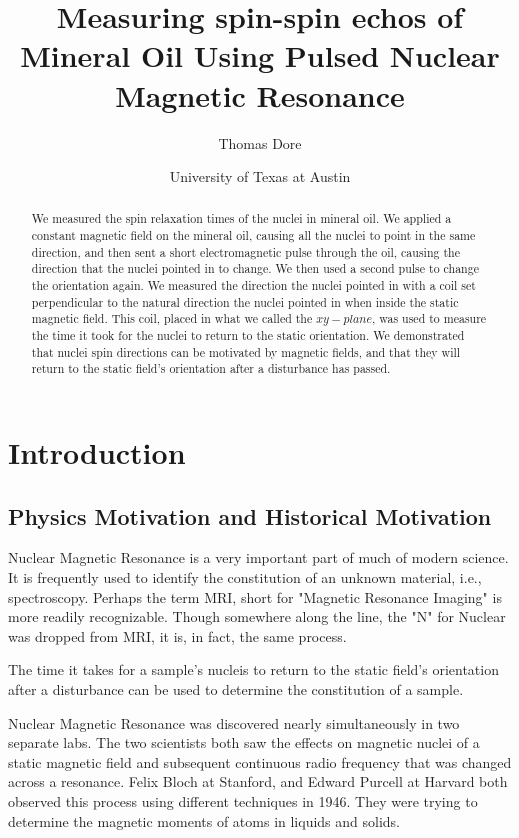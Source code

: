 \documentclass{article}
\title{Measuring spin-spin echos of Mineral Oil Using Pulsed Nuclear Magnetic Resonance}
\author{Thomas Dore}
\date{University of Texas at Austin}
\begin{document}
\maketitle

\begin{abstract}
We measured the spin relaxation times of the nuclei in mineral oil. We applied a constant magnetic field on the mineral oil, causing all the nuclei to point in the same direction, and then sent a short electromagnetic pulse through the oil, causing the direction that the nuclei pointed in to change. We then used a second pulse to change the orientation again. We measured the direction the nuclei pointed in with a coil set perpendicular to the natural direction the nuclei pointed in when inside the static magnetic field. This coil, placed in what we called the $xy-plane$, was used to measure the time it took for the nuclei to return to the static orientation. We demonstrated that nuclei spin directions can be motivated by magnetic fields, and that they will return to the static field's orientation after a disturbance has passed.
\end{abstract}

\bigskip

\section{Introduction}
\subsection{Physics Motivation and Historical Motivation}
    
    Nuclear Magnetic Resonance is a very important part of much of modern science. It is frequently used to identify the constitution of an unknown material, i.e., spectroscopy. Perhaps the term MRI, short for "Magnetic Resonance Imaging" is more readily recognizable. Though somewhere along the line, the "N" for Nuclear was dropped from MRI, it is, in fact, the same process.
    
\bigskip

    The time it takes for a sample's nucleis to return to the static field's orientation after a disturbance can be used to determine the constitution of a sample. 

\bigskip

Nuclear Magnetic Resonance was discovered nearly simultaneously in two separate labs. The two scientists both saw the effects on magnetic nuclei of a static magnetic field and subsequent continuous radio frequency that was changed across a resonance. Felix Bloch at Stanford, and Edward Purcell at Harvard both observed this process using different techniques in 1946. They were trying to determine the magnetic moments of atoms in liquids and solids.
\end{document}
